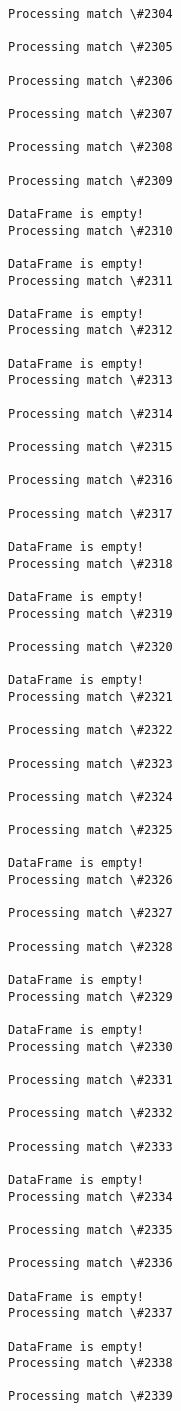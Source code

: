 \documentclass[11pt]{article}
\begin{document}
\begin{Verbatim}[commandchars=\\\{\}]
Processing match \#2304

Processing match \#2305

Processing match \#2306

Processing match \#2307

Processing match \#2308

Processing match \#2309

DataFrame is empty!
Processing match \#2310

DataFrame is empty!
Processing match \#2311

DataFrame is empty!
Processing match \#2312

DataFrame is empty!
Processing match \#2313

Processing match \#2314

Processing match \#2315

Processing match \#2316

Processing match \#2317

DataFrame is empty!
Processing match \#2318

DataFrame is empty!
Processing match \#2319

Processing match \#2320

DataFrame is empty!
Processing match \#2321

Processing match \#2322

Processing match \#2323

Processing match \#2324

Processing match \#2325

DataFrame is empty!
Processing match \#2326

Processing match \#2327

Processing match \#2328

DataFrame is empty!
Processing match \#2329

DataFrame is empty!
Processing match \#2330

Processing match \#2331

Processing match \#2332

Processing match \#2333

DataFrame is empty!
Processing match \#2334

Processing match \#2335

Processing match \#2336

DataFrame is empty!
Processing match \#2337

DataFrame is empty!
Processing match \#2338

Processing match \#2339


\end{Verbatim}
\end{document}
